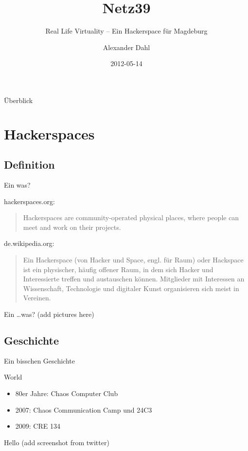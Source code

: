 \documentclass[hyperref={pdfpagelabels=false}]{beamer}
\title[Netz39]{Netz39}
\subtitle{Real Life Virtuality -- Ein Hackerspace für Magdeburg}
\author{Alexander Dahl}
\institute[netz39.de]{\url{http://www.netz39.de/}}
\date{2012-05-14}
\begin{document}
\begin{frame}
	\titlepage
\end{frame}

\begin{frame}{Überblick}
    \tableofcontents
\end{frame}

\section{Hackerspaces}

\subsection{Definition}

\begin{frame}{Ein was?}
    \begin{block}{hackerspaces.org:}
        \begin{quote}
            Hackerspaces are community-operated physical places, where people
            can meet and work on their projects.
        \end{quote}
    \end{block}
    \pause
    \begin{block}{de.wikipedia.org:}
        \begin{quote}
            Ein Hackerspace (von Hacker und Space, engl. für Raum) oder
            Hackspace ist ein physischer, häufig offener Raum, in dem sich
            Hacker und Interessierte treffen und austauschen können.
            Mitglieder mit Interessen an Wissenschaft, Technologie und
            digitaler Kunst organisieren sich meist in Vereinen.
        \end{quote}
    \end{block}
\end{frame}

\begin{frame}{Ein \dots was?}
    (add pictures here)
\end{frame}

\subsection{Geschichte}

\begin{frame}{Ein bisschen Geschichte}
    \begin{block}{World}
        \begin{itemize}
            \item 80er Jahre: Chaos Computer Club
            \item 2007: Chaos Communication Camp und 24C3
            \item 2009: CRE 134
        \end{itemize}
    \end{block}
    \pause
    \begin{block}{Hello}
        (add screenshot from twitter)
    \end{block}
\end{frame}
\end{document}
